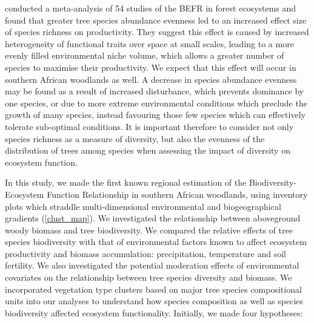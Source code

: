 \documentclass[11pt,a4paper]{article}
\begin{document}
\citep{Zhang2012} conducted a meta-analysis of 54 studies of the BEFR in forest ecosystems and found that greater tree species abundance evenness led to an increased effect size of species richness on productivity. They suggest this effect is caused by increased heterogeneity of functional traits over space at small scales, leading to a more evenly filled environmental niche volume, which allows a greater number of species to maximise their productivity. We expect that this effect will occur in southern African woodlands as well. A decrease in species abundance evenness may be found as a result of increased disturbance, which prevents dominance by one species, or due to more extreme environmental conditions which preclude the growth of many species, instead favouring those few species which can effectively tolerate sub-optimal conditions. It is important therefore to consider not only species richness as a measure of diversity, but also the evenness of the distribution of trees among species when assessing the impact of diversity on ecosystem function.


In this study, we made the first known regional estimation of the Biodiversity-Ecosystem Function Relationship in southern African woodlands, using inventory plots which straddle multi-dimensional environmental and biogeographical gradients (\autoref{clust_map}). We investigated the relationship between aboveground woody biomass and tree biodiversity. We compared the relative effects of tree species biodiversity with that of environmental factors known to affect ecosystem productivity and biomass accumulation: precipitation, temperature and soil fertility. We also investigated the potential moderation effects of environmental covariates on the relationship between tree species diversity and biomass. We incorporated vegetation type clusters based on major tree species compositional units into our analyses to understand how species composition as well as species biodiversity affected ecosystem functionality. Initially, we made four hypotheses: 
\end{document}
